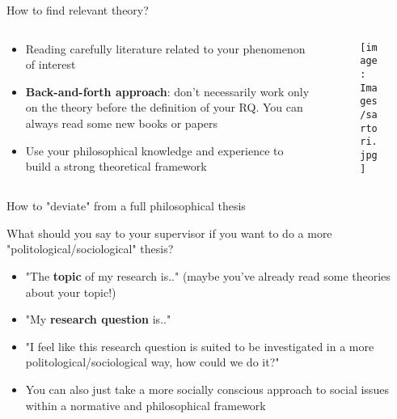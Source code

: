 \documentclass[10pt, aspectratio=169]{beamer}
\begin{document}
\begin{frame}{How to find relevant theory?}
\begin{columns}
\begin{column}{0.6\textwidth}
    \begin{itemize}
        \item Reading carefully literature related to your phenomenon of interest \vspace{0.3cm}
        \item \textbf{Back-and-forth approach}: don't necessarily work only on the theory before the definition of your RQ. You can always read some new books or papers \vspace{0.3cm}
        \item Use your philosophical knowledge and experience to build a strong theoretical framework 
    \end{itemize}
\end{column}
\begin{column}{0.4\textwidth}
\begin{figure}
    \centering
    \texttt{[image: Images/sartori.jpg]}
    \label{fig:enter-label}
\end{figure}
\end{column}
\end{columns}
\end{frame}

\begin{frame}{How to "deviate" from a full philosophical thesis}
\begin{center}
    What should you say to your supervisor if you want to do a more "politological/sociological" thesis?
\end{center}
    \begin{itemize}
        \item "The \textbf{topic} of my research is.." (maybe you've already read some theories about your topic!)  \vspace{0.3cm}
        \item "My \textbf{research question} is.." \vspace{0.3cm}
        \item "I feel like this research question is suited to be investigated in a more politological/sociological way, how could we do it?" \vspace{0.3cm}
        \item You can also just take a more socially conscious approach to social issues within a normative and philosophical framework \vspace{0.3cm}
    \end{itemize}
\end{frame}
\end{document}
